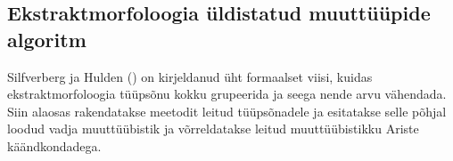 \documentclass[12pt,a4paper]{article}
\begin{document}
\subsection{Ekstraktmorfoloogia üldistatud muuttüüpide algoritm}
\label{sec:muuttüüpide-süsteem}


Silfverberg ja Hulden (\citeyear{silfverberg_computational_2018}) on kirjeldanud üht formaalset viisi, kuidas ekstrakt\-morfoloogia tüüpsõnu kokku grupeerida ja seega nende arvu vähendada. Siin alaosas rakendatakse meetodit leitud tüüpsõnadele ja esitatakse selle põhjal loodud vadja muuttüübistik ja võrreldatakse leitud muuttüübistikku Ariste käändkondadega.



\end{document}
